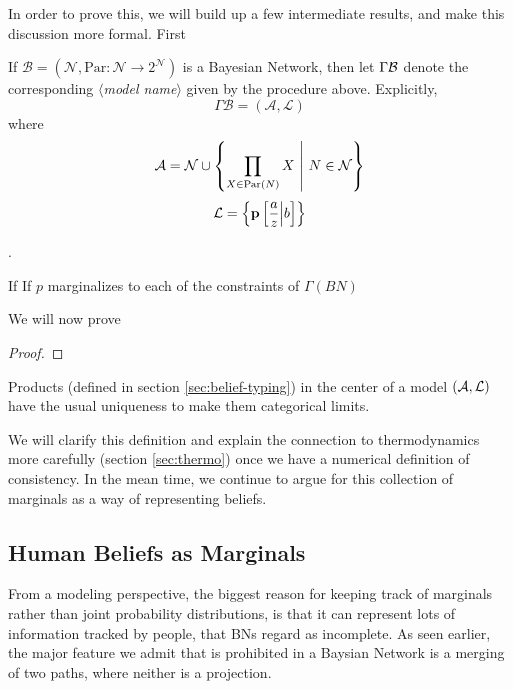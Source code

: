 \documentclass{article}
\newcommand\modelname{{\color{blue!50!black}$\langle$\itshape model name$\rangle$ }}
\begin{document}
	In order to prove this, we will build up a few intermediate results, and make this discussion more formal. First
	
	\begin{defn}
		If $\mathcal B = (\mathcal N, \mathrm{Par}: \mathcal N \to 2^{\mathcal N})$ is a Bayesian Network, then let $\Gamma \cal B$ denote the corresponding \modelname given by the procedure above. Explicitly, 
		\[ \Gamma\mathcal B =  (\mathcal A, \mathcal L) \]
		where 
		\[ \mathcal A = \mathcal N \cup \left\{ \prod_{X \in \mathrm{Par}(N)} X ~\middle|~ N \in \cal N \right\} \]
		\[ \mathcal L = \left\{  \cpm p(\frac{a}{z}|b) \right\} \]
	\end{defn}
	.
	
	\begin{lemma}
		If If $p$ marginalizes to each of the constraints of $\Gamma(BN)$
	\end{lemma}

	We will now prove 
	\begin{proof}
		
	\end{proof}

	\begin{coro}
		Products (defined in section \ref{sec:belief-typing}) in the center of a model $(\cal A, L)$ have the usual uniqueness to make them categorical limits.
	\end{coro}

	We will clarify this definition and explain the connection to thermodynamics more carefully (section \ref{sec:thermo}) once we have a numerical definition of consistency. In the mean time, we continue to argue for this collection of marginals as a way of representing beliefs.

	
	
	\subsection{Human Beliefs as Marginals}\label{sec:human-belief-marginals}
	From a modeling perspective, the biggest reason for keeping track of marginals rather than joint probability distributions, is that it can represent lots of information tracked by people, that BNs regard as incomplete. As seen earlier, the major feature we admit that is prohibited in a Baysian Network is a merging of two paths, where neither is a projection.
	
\end{document}
